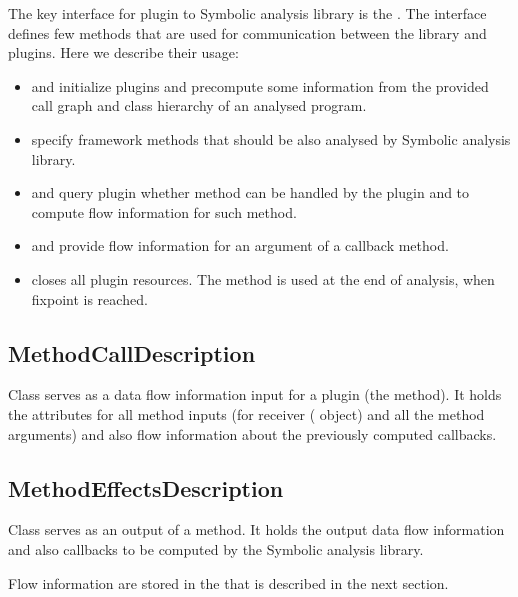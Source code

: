 The key interface for plugin to Symbolic analysis library is the .
The interface defines few methods that are used for communication between the library and plugins.
Here we describe their usage:
\begin{itemize}
  \item {} and  initialize plugins
    and precompute some information from the provided call graph and class hierarchy
    of an analysed program.
  \item {} specify framework methods that should
    be also analysed by Symbolic analysis library.
  \item {} and  query plugin whether method can be
    handled by the plugin and to compute flow information for such method.
  \item {} and  provide flow information for
    an argument of a callback method.
  \item {} closes all plugin resources. The method is used at the end of analysis,
    when fixpoint is reached.
\end{itemize}




\subsection{MethodCallDescription}

Class  serves as a data flow information input for a plugin
(the  method).
It holds the attributes for all method inputs
(for receiver ( object) and all the method arguments)
and also flow information about the previously computed callbacks.




\subsection{MethodEffectsDescription}

Class  serves as an output of a
 method. It holds the output data flow information
and also callbacks to be computed by the Symbolic analysis library.

Flow information are stored in the  that
is described in the next section.



